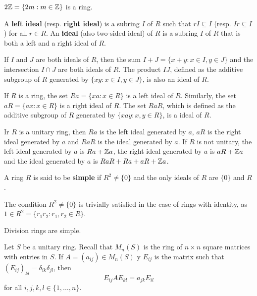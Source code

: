 \begin{example}
	$2\mathbb{Z}=\{2m:m\in\mathbb{Z}\}$ is a ring.  
\end{example}

A \textbf{left ideal} (resp. \textbf{right ideal}) is a subring $I$ of $R$ such that 
$rI\subseteq I$ (resp. $Ir\subseteq I$) for all $r\in R$. An \textbf{ideal}
(also two-sided ideal) of $R$ is a subring $I$ of $R$ that is both a left and a right ideal of $R$.

\begin{example}
	If $I$ and $J$ are both ideals of $R$, then the sum $I+J=\{x+y:x\in I,y\in J\}$ and
	the intersection $I\cap J$ are both ideals of $R$. The product $IJ$, defined as the additive
	subgroup of $R$ generated by $\{xy:x\in I,y\in J\}$, is also an ideal of $R$. 
\end{example}

\begin{example}
	If $R$ is a ring, the set $Ra =\{xa: x\in R\}$ is a left ideal
	of $R$. Similarly, the set $aR =\{ax: x\in R\}$ is a right ideal of $R$. The set $RaR$, which is
	defined as the additive subgroup of $R$ generated by $\{xay: x, y\in R\}$, is a
	ideal of $R$.
\end{example}

\begin{example}
	Ir $R$ is a unitary ring, then $Ra$ is the left ideal generated by $a$, $aR$ is
	the right ideal generated by $a$ and $RaR$ is the ideal generated by $a$. 
	If $R$ is not unitary, the left ideal generated by $a$ is $Ra+\mathbb{Z} a$,
	the right ideal generated by $a$ is $aR+\mathbb{Z} a$ and the ideal generated by 
	$a$ is $RaR+Ra+aR+\mathbb{Z} a$.
\end{example}

\begin{definition}
A ring $R$ is said to be \textbf{simple} if $R^2\ne\{0\}$ and the only ideals of 
$R$ are $\{0\}$ and $R$.  
\end{definition}

The condition $R^2\ne\{0\}$ is trivially satisfied in the case of rings
with identity, as $1\in R^2=\{r_1r_2:r_1,r_2\in R\}$.

\begin{example}
	Division rings are simple.
\end{example}

Let $S$ be a unitary ring. Recall that $M_n(S)$ is the ring of $n\times n$ square matrices 
with entries in $S$.  If $A=(a_{ij})\in M_n(S)$ y $E_{ij}$ is the matrix
such that $(E_{ij})_{kl}=\delta_{ik}\delta_{jl}$, then
\begin{equation}
	\label{eq:trick}
E_{ij}AE_{kl}=a_{jk}E_{il}
\end{equation}
for all $i,j,k,l\in\{1,\dots,n\}$. 

